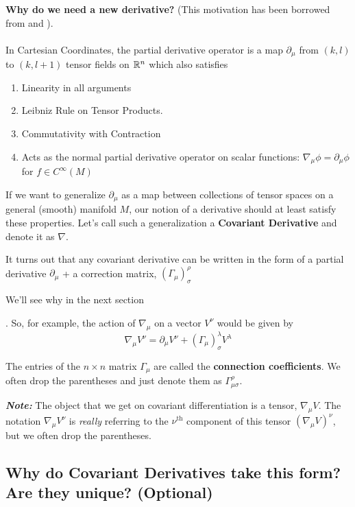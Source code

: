\documentclass[11pt]{article}
\begin{document}
\begin{bluebox}
  \textbf{Why do we need a new derivative?}
  (This motivation has been borrowed from \cite{Carroll97} and \cite{Wald84}).
  \\
  \\
  In Cartesian Coordinates, the partial derivative operator is a map $\partial_{\mu}$ from $(k,l)$ to $(k, l+1)$ tensor fields on $\mathbb{R}^n$ \cite{Carroll97} which also satisfies 
  \begin{enumerate}
    \item Linearity in all arguments
    \item Leibniz Rule on Tensor Products.
    \item Commutativity with Contraction
    \item Acts as the normal partial derivative operator on scalar functions: 
    $\nabla_{\mu} \phi = \partial_{\mu} \phi$ for $f \in C^{\infty}(M)$
  \end{enumerate}
  If we want to generalize $\partial_{\mu}$ as a map between collections of tensor spaces on a general (smooth) manifold $M$, our notion of a derivative should at least satisfy these properties. Let's call such a generalization a \textbf{Covariant Derivative} and denote it as $\nabla$.
\end{bluebox}

It turns out that any covariant derivative can be written in the form of a partial derivative $\partial_{\mu}$ + a correction matrix, $(\Gamma_{\mu})_{\sigma}^{\rho}$ \begin{thought}{We'll see why in the next section}\end{thought}. So, for example, the action of $\nabla_{\mu}$ on a vector $V^{\nu}$ would be given by
\[  \nabla_{\mu} V^{\nu} = \partial_{\mu} V^{\nu} + (\Gamma_{\mu})_{\sigma}^{\lambda} V^{\lambda} \]

The entries of the $n \times n$ matrix $\Gamma_{\mu}$ are called the \textbf{connection coefficients}. We often drop the parentheses and just denote them as $\Gamma_{\mu \sigma}^{\rho}$.

\begin{redbox}
  \textbf{\emph{Note:}} The object that we get on covariant differentiation is a tensor, $\nabla_{\mu} V$. The notation $\nabla_{\mu} V^{\nu}$ is \emph{really} referring to the $\nu^{\text{th}}$ component of this tensor $(\nabla_{\mu} V)^{\nu}$, but we often drop the parentheses.
\end{redbox}

\subsection{Why do Covariant Derivatives take this form? Are they unique? (Optional)}
\end{document}
